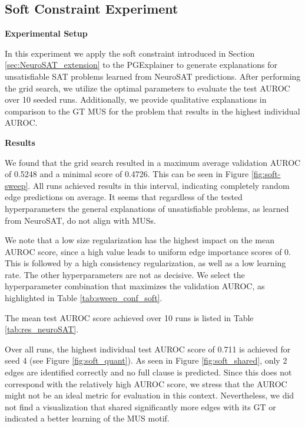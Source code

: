 \subsection{Soft Constraint Experiment}
\label{sec:sat-soft-exp}
\textbf{Experimental Setup}\par
In this experiment we apply the soft constraint introduced in Section \ref{sec:NeuroSAT_extension} to the PGExplainer to generate explanations for unsatisfiable SAT problems learned from NeuroSAT predictions. After performing the grid search, we utilize the optimal parameters to evaluate the test AUROC over 10 seeded runs. Additionally, we provide qualitative explanations in comparison to the \ac{GT} MUS for the problem that results in the highest individual AUROC. \bigskip

\textbf{Results}\par
We found that the grid search resulted in a maximum average validation AUROC of 0.5248 and a minimal score of 0.4726. This can be seen in Figure \ref{fig:soft-sweep}. All runs achieved results in this interval, indicating completely random edge predictions on average. It seems that regardless of the tested hyperparameters the general explanations of unsatisfiable problems, as learned from NeuroSAT, do not align with \acp{MUS}.

We note that a low size regularization has the highest impact on the mean AUROC score, since a high value leads to uniform edge importance scores of 0. This is followed by a high consistency regularization, as well as a low learning rate. The other hyperparameters are not as decisive. We select the hyperparameter combination that maximizes the validation AUROC, as highlighted in Table \ref{tab:sweep_conf_soft}. \bigskip

The mean test AUROC score achieved over 10 runs is listed in Table \ref{tab:res_neuroSAT}.

Over all runs, the highest individual test AUROC score of 0.711 is achieved for seed 4 (see Figure \ref{fig:soft_quant}). As seen in Figure \ref{fig:soft_shared}, only 2 edges are identified correctly and no full clause is predicted. Since this does not correspond with the relatively high AUROC score, we stress that the AUROC might not be an ideal metric for evaluation in this context. Nevertheless, we did not find a visualization that shared significantly more edges with its \ac{GT} or indicated a better learning of the MUS motif.

